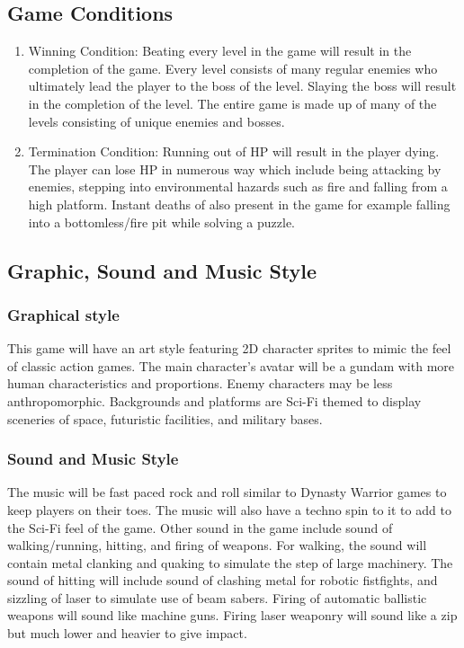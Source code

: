 \documentclass{article}
\begin{document}
\subsection*{Game Conditions}
    \begin{enumerate}
        \item Winning Condition: Beating every level in the game will result in the completion of the game.
        Every level consists of many regular enemies who ultimately lead the player to the boss of the level. Slaying the boss will result in the completion of the level. The entire game is made up of many of the levels consisting of unique enemies and bosses.
        \item Termination Condition: Running out of HP will result in the player dying. 
        The player can lose HP in numerous way which include being attacking by enemies, stepping into environmental hazards such as fire and falling from a high platform. Instant deaths of also present in the game for example falling into a bottomless/fire pit while solving a puzzle.
    \end{enumerate}

\subsection*{Graphic, Sound and Music Style}
    \subsubsection*{Graphical style}
    This game will have an art style featuring 2D character sprites to mimic the feel of classic action games. The main character’s avatar will be a gundam with more human characteristics and proportions. Enemy characters may be less anthropomorphic. Backgrounds and platforms are Sci-Fi themed to display sceneries of space, futuristic facilities, and military bases.
    \subsubsection*{Sound and Music Style}
    The music will be fast paced rock and roll similar to Dynasty Warrior games to keep players on their toes. The music will also have a techno spin to it to add to the Sci-Fi feel of the game. Other sound in the game include sound of walking/running, hitting, and firing of weapons. For walking, the sound will contain metal clanking and quaking to simulate the step of large machinery. The sound of hitting will include sound of clashing metal for robotic fistfights, and sizzling of laser to simulate use of beam sabers. Firing of automatic ballistic weapons will sound like machine guns. Firing laser weaponry will sound like a zip but much lower and heavier to give impact.
    
\end{document}
